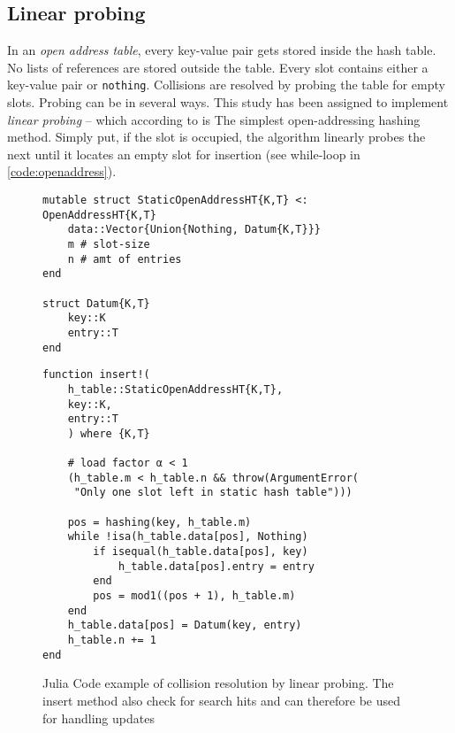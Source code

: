 \documentclass[a4paper, 11pt]{article}
\begin{document}
    \subsection*{Linear probing}
    In an \emph{open address table}, every key-value pair gets stored inside the hash table. 
    No lists of references are stored
    outside the table. Every slot contains either a key-value pair or \texttt{nothing}.
    Collisions are resolved by probing the table for empty slots.
    Probing can be in several ways. This study has been assigned to implement 
    \emph{linear probing} -- which according to \textcite{Segeqick2011Alg4th} is The
    simplest open-addressing hashing method. 
    Simply put, if the slot is occupied, 
    the algorithm linearly probes the next until it locates an empty slot for insertion 
    (see while-loop in \autoref{code:openaddress}).

    \begin{figure}[h]
        \centering
    \begin{verbatim}
mutable struct StaticOpenAddressHT{K,T} <: OpenAddressHT{K,T}
    data::Vector{Union{Nothing, Datum{K,T}}}
    m # slot-size
    n # amt of entries
end

struct Datum{K,T}
    key::K
    entry::T
end
    \end{verbatim}
    \begin{verbatim}
function insert!(
    h_table::StaticOpenAddressHT{K,T}, 
    key::K,
    entry::T
    ) where {K,T}

    # load factor α < 1 
    (h_table.m < h_table.n && throw(ArgumentError(
     "Only one slot left in static hash table")))

    pos = hashing(key, h_table.m)
    while !isa(h_table.data[pos], Nothing)
        if isequal(h_table.data[pos], key)
            h_table.data[pos].entry = entry
        end
        pos = mod1((pos + 1), h_table.m)
    end
    h_table.data[pos] = Datum(key, entry)
    h_table.n += 1
end
    \end{verbatim}
    \caption{Julia Code example of collision resolution by linear probing. 
    The insert method also check for search hits and can therefore be used for
    handling updates} %
    \label{code:openaddress} %
    \end{figure}
\end{document}
